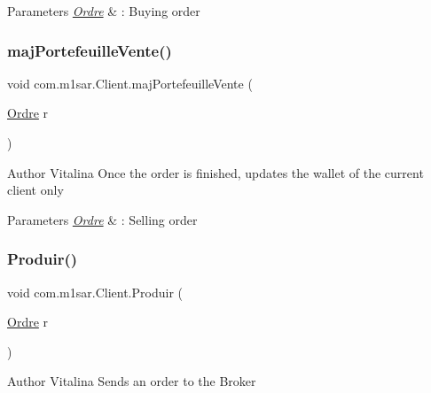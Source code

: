 \begin{DoxyParams}{Parameters}
{\em \hyperlink{classcom_1_1m1sar_1_1_ordre}{Ordre}} & \+: Buying order \\
\hline
\end{DoxyParams}
\mbox{\label{classcom_1_1m1sar_1_1_client_afa011fd42124137bc9131ae8b9f2851d}} 
\subsubsection{\texorpdfstring{maj\+Portefeuille\+Vente()}{majPortefeuilleVente()}}
{\footnotesize\ttfamily void com.\+m1sar.\+Client.\+maj\+Portefeuille\+Vente (\begin{DoxyParamCaption}\item[{\hyperlink{classcom_1_1m1sar_1_1_ordre}{Ordre}}]{r }\end{DoxyParamCaption})}

\begin{DoxyAuthor}{Author}
Vitalina Once the order is finished, updates the wallet of the current client only 
\end{DoxyAuthor}

\begin{DoxyParams}{Parameters}
{\em \hyperlink{classcom_1_1m1sar_1_1_ordre}{Ordre}} & \+: Selling order \\
\hline
\end{DoxyParams}
\mbox{\label{classcom_1_1m1sar_1_1_client_af8ee1c17e73359f447bc14b8fe4b790c}} 
\subsubsection{\texorpdfstring{Produir()}{Produir()}}
{\footnotesize\ttfamily void com.\+m1sar.\+Client.\+Produir (\begin{DoxyParamCaption}\item[{\hyperlink{classcom_1_1m1sar_1_1_ordre}{Ordre}}]{r }\end{DoxyParamCaption})}

\begin{DoxyAuthor}{Author}
Vitalina Sends an order to the Broker 
\end{DoxyAuthor}

